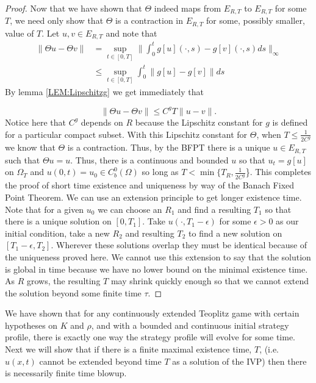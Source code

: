 \documentclass[aps,
preprint,
groupedaddress,
showkeys,
amsmath]{revtex4-2}
\begin{document}
\begin{proof}
        Now that we have shown that $\Theta$ indeed maps from $E_{R,T}$ to $E_{R,T}$ for some $T$, we need only show that $\Theta$ is a contraction in $E_{R,T}$ for some, possibly smaller, value of $T$. Let $u,v \in E_{R,T}$ and note that
        \begin{equation*}
        \begin{split} 
            \|\Theta u-\Theta v\| &= \sup_{t\in[0,T]} \bigg\|\int_0^tg[u](\cdot,s)-g[v](\cdot,s)ds\bigg\|_{\infty}\\
            &\leq \sup_{t\in[0,T]}\int_0^t\|g[u]-g[v]\|ds
            \end{split} 
        \end{equation*}
        By lemma \ref{LEM:Lipschitzg} we get immediately that
        
       \[\|\Theta u-\Theta v\|\leq C^gT\|u-v\|.\] Notice here that $C^g$ depends on $R$ because the Lipschitz constant for $g$ is defined for a particular compact subset.  
        With this Lipschitz constant for $\Theta$, when $T\leq\frac{1}{2C^g}$ we know that $\Theta$ is a contraction. Thus, by the BFPT  there is a unique $u\in E_{R,T}$ such that $\Theta u = u$.  Thus, there is a continuous and bounded $u$ so that $u_t=g[u]$ on $\Omega_T$ and $u(0,t)=u_0\in C^0_b(\Omega)$ so long as $T<\min\{T_R,\frac{1}{2C^g}$\}. This completes the proof of short time existence and uniqueness by way of the Banach Fixed Point Theorem. We can use an extension principle to get longer existence time. Note that for a given $u_0$ we can choose an $R_1$ and find a resulting $T_1$ so that there is a unique solution on $[0,T_1]$. Take $u(\cdot, T_1-\epsilon)$ for some $\epsilon>0$ as our initial condition, take a new $R_2$ and resulting $T_2$ to find a new solution on $[T_1-\epsilon, T_2]$. Wherever these solutions overlap they must be identical because of the uniqueness proved here. We cannot use this extension to say that the solution is global in time because we have no lower bound on the minimal existence time. As $R$ grows, the resulting $T$ may shrink quickly enough so that we cannot extend the solution beyond some finite time $\tau$.     
    \end{proof}

    We have shown that for any continuously extended Teoplitz game with certain hypotheses on $K$ and $\rho$, and with a bounded and continuous initial strategy profile, there is exactly one way the strategy profile will evolve for some time. Next we will show that if there is a finite maximal existence time, $T$, (i.e. $u(x,t)$ cannot be extended beyond time $T$ as a solution of the IVP) then there is necessarily finite time blowup.
\end{document}

